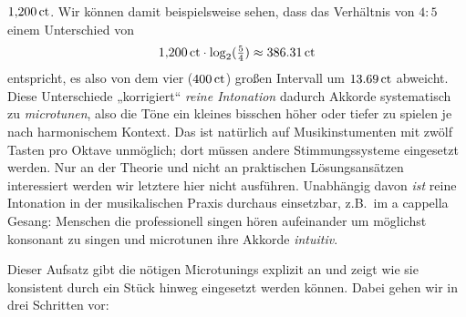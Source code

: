 \documentclass[british,11pt]{scrartcl}
\begin{document}
$1{,}200\,\mathrm{ct}$. Wir können damit beispielsweise sehen, dass das Verhältnis
von $4:5$ einem Unterschied von
\[1{,}200\,\mathrm{ct}\cdot \log_2(\tfrac54) \approx 386.31\,\mathrm{ct}\]%
entspricht, es also von dem vier  ($400\,\mathrm{ct}$) großen Intervall um
$13.69\,\mathrm{ct}$ abweicht. Diese Unterschiede „korrigiert“
\emph{reine Intonation} dadurch Akkorde systematisch zu \emph{microtunen}, also
die Töne ein kleines bisschen höher oder tiefer zu spielen je nach harmonischem
Kontext. Das ist natürlich auf Musikinstumenten mit zwölf Tasten pro Oktave
unmöglich; dort müssen andere Stimmungssysteme eingesetzt werden. Nur an der
Theorie und nicht an praktischen Lösungsansätzen interessiert werden wir
letztere hier nicht ausführen. Unabhängig davon \emph{ist} reine Intonation in
der musikalischen Praxis durchaus einsetzbar, z.B.\ im a cappella Gesang:
Menschen die professionell singen hören aufeinander um möglichst konsonant zu
singen und microtunen ihre Akkorde \emph{intuitiv}.

Dieser Aufsatz gibt die nötigen Microtunings explizit an und zeigt wie sie
konsistent durch ein Stück hinweg eingesetzt werden können. Dabei gehen wir in
drei Schritten vor:
\end{document}
